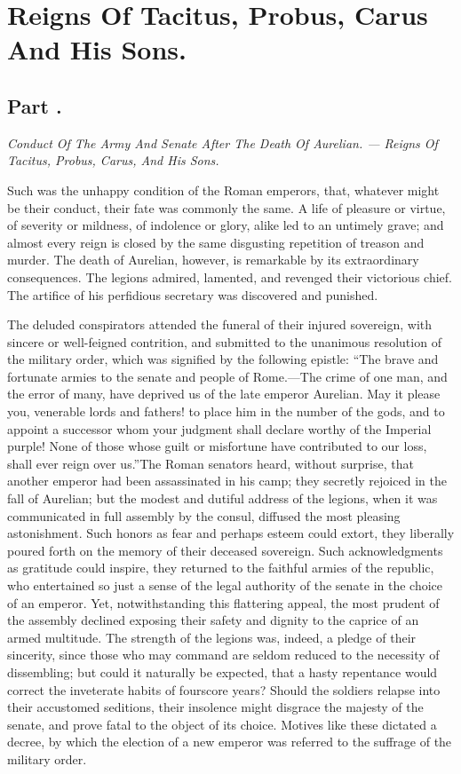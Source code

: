 \chapter{Reigns Of Tacitus, Probus, Carus And His Sons.}
\section{Part \thesection.}

\textit{Conduct Of The Army And Senate After The Death Of Aurelian.
— Reigns Of Tacitus, Probus, Carus, And His Sons.}
\vspace{\onelineskip}

Such was the unhappy condition of the Roman emperors, that,
whatever might be their conduct, their fate was commonly the
same. A life of pleasure or virtue, of severity or mildness, of
indolence or glory, alike led to an untimely grave; and almost
every reign is closed by the same disgusting repetition of
treason and murder. The death of Aurelian, however, is remarkable
by its extraordinary consequences. The legions admired, lamented,
and revenged their victorious chief. The artifice of his
perfidious secretary was discovered and punished.

The deluded conspirators attended the funeral of their injured
sovereign, with sincere or well-feigned contrition, and submitted
to the unanimous resolution of the military order, which was
signified by the following epistle: “The brave and fortunate
armies to the senate and people of Rome.—The crime of one man,
and the error of many, have deprived us of the late emperor
Aurelian. May it please you, venerable lords and fathers! to
place him in the number of the gods, and to appoint a successor
whom your judgment shall declare worthy of the Imperial purple!
None of those whose guilt or misfortune have contributed to our
loss, shall ever reign over us.”\footnotemark[1] The Roman senators heard,
without surprise, that another emperor had been assassinated in
his camp; they secretly rejoiced in the fall of Aurelian; but the
modest and dutiful address of the legions, when it was
communicated in full assembly by the consul, diffused the most
pleasing astonishment. Such honors as fear and perhaps esteem
could extort, they liberally poured forth on the memory of their
deceased sovereign. Such acknowledgments as gratitude could
inspire, they returned to the faithful armies of the republic,
who entertained so just a sense of the legal authority of the
senate in the choice of an emperor. Yet, notwithstanding this
flattering appeal, the most prudent of the assembly declined
exposing their safety and dignity to the caprice of an armed
multitude. The strength of the legions was, indeed, a pledge of
their sincerity, since those who may command are seldom reduced
to the necessity of dissembling; but could it naturally be
expected, that a hasty repentance would correct the inveterate
habits of fourscore years? Should the soldiers relapse into their
accustomed seditions, their insolence might disgrace the majesty
of the senate, and prove fatal to the object of its choice.
Motives like these dictated a decree, by which the election of a
new emperor was referred to the suffrage of the military order.

